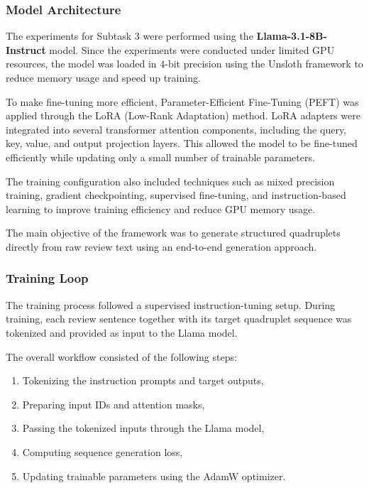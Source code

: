 \documentclass{article}
\begin{document}
\subsubsection{Model Architecture}

The experiments for Subtask 3 were performed using the \textbf{Llama-3.1-8B-Instruct} model. Since the experiments were conducted under limited GPU resources, the model was loaded in 4-bit precision using the Unsloth framework to reduce memory usage and speed up training.

To make fine-tuning more efficient, Parameter-Efficient Fine-Tuning (PEFT) was applied through the LoRA (Low-Rank Adaptation) method. LoRA adapters were integrated into several transformer attention components, including the query, key, value, and output projection layers. This allowed the model to be fine-tuned efficiently while updating only a small number of trainable parameters.

The training configuration also included techniques such as mixed precision training, gradient checkpointing, supervised fine-tuning, and instruction-based learning to improve training efficiency and reduce GPU memory usage.

The main objective of the framework was to generate structured quadruplets directly from raw review text using an end-to-end generation approach.

\subsubsection{Training Loop}

The training process followed a supervised instruction-tuning setup. During training, each review sentence together with its target quadruplet sequence was tokenized and provided as input to the Llama model.

The overall workflow consisted of the following steps:
\begin{enumerate}
    \item Tokenizing the instruction prompts and target outputs,
    \item Preparing input IDs and attention masks,
    \item Passing the tokenized inputs through the Llama model,
    \item Computing sequence generation loss,
    \item Updating trainable parameters using the AdamW optimizer.
\end{enumerate}
\end{document}
